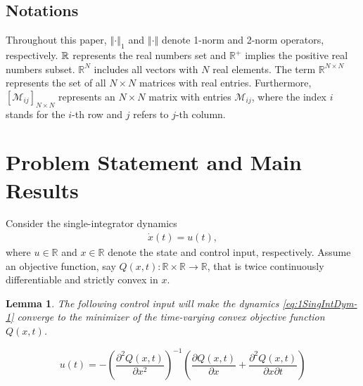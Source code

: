 \documentclass[letterpaper, 10 pt, conference]{ieeeconf}  %
\newtheorem{lemma}[theorem]{Lemma}
\begin{document}
{\subsection{Notations}

Throughout this paper, $\left\Vert \cdot\right\Vert _{1}$ and $\left\Vert \cdot\right\Vert $
denote 1-norm and 2-norm operators, respectively. $\text{\ensuremath{\mathbb{{R}}}}$
represents the real numbers set and $\mathbb{{R}}^{+}$ implies the
positive real numbers subset. $\mathbb{{R}}^{N}$ includes all vectors
with $N$ real elements. The term  $\mathbb{{R}}^{N\times N}$ represents the
set of all $N\times N$ matrices with real entries. Furthermore,  $[\mathcal{{M}}_{ij}]_{N\times N}$
represents an $N\times N$ matrix with entries $\mathcal{{M}}_{ij}$,
where the index $i$ stands for the $i$-th row and $j$ refers to
$j$-th column.



\section{Problem Statement and Main Results}\label{sec:main}

Consider the single-integrator dynamics
\begin{equation}
\ensuremath{\begin{array}{l}
	{\dot{x}}(t)={u}(t),\end{array}}\label{eq:1SingIntDym-1}
\end{equation}
where $u\in\mathbb{{R}}$ and $x\in\mathbb{{R}}$ denote the  state and
control input, respectively. Assume an objective function, say $Q(x,t):\mathbb{{R}\times\mathbb{{R}\rightarrow\mathbb{{R}}}}$,
that is twice continuously differentiable and strictly convex in $x$.
\begin{lemma}
	The following control input will make the dynamics \eqref{eq:1SingIntDym-1}
	converge to the minimizer of the time-varying convex objective function
	$Q(x,t)$.
\end{lemma}
\begin{equation}
u(t)=-\left(\frac{\partial^{2}Q(x,t)}{\partial x^{2}}\right)^{-1}\left(\frac{\partial Q(x,t)}{\partial x}+\frac{\partial^{2}Q(x,t)}{\partial x\partial t}\right)\label{eq:1CentLaw-1}
\end{equation}

}
\end{document}
